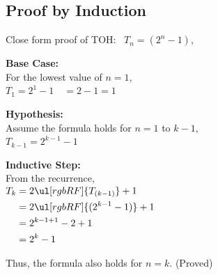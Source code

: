 

\vspace{2em}
\subsection*{Proof by Induction}

\vspace{1em}
\begin{minipage}[t]{0.45\textwidth}
\vspace{0pt} 
Close form proof of TOH: \ $T_n = \left(2^n - 1\right)$,

\vspace{0.5em}
\textbf{Base Case:}\\[0.5em]
For the lowest value of $n = 1$,\\[0.5em]
$T_1 = 2^1 - 1 \quad = 2 - 1 = 1$

\vspace{1em}
\textbf{Hypothesis:}\\[0.5em]
Assume the formula holds for $n = 1$ to $k-1$,\\[0.5em]
$T_{k-1} = 2^{k-1} - 1$

\vspace{1em}
\textbf{Inductive Step:}\\[0.5em]
From the recurrence,\\[0.5em]
$\begin{aligned}
   T_k & = 2\ul[rgbRF]{T_{(k-1)}} + 1 \\
   &= 2\ul[rgbRF]{(2^{k-1} - 1)} + 1 \\
   &= 2^{k-1+1} - 2 + 1 \\
   &= 2^k - 1
\end{aligned}$

\vspace{1em}
Thus, the formula also holds for $n = k$. (Proved)
\end{minipage}%
\hfill{\color{lightgray}\vrule}\hfill
